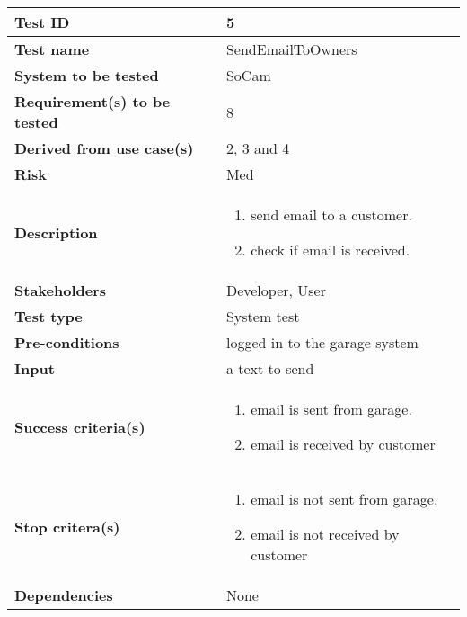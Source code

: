 		\begin{table}[H]
			\begin{tabular}{| p{4cm} | p{10cm} |}
			\hline
			\rowcolor{gray}
				{\bf Test ID} & 5 \\ \hline
				{\bf Test name} & SendEmailToOwners \\ \hline
				{\bf System to be tested} & SoCam \\ \hline
				{\bf Requirement(s) to be tested} & 8 \\ \hline
				{\bf Derived from use case(s)} & 2, 3 and 4\\ \hline
				{\bf Risk} & Med \\ \hline
				{\bf Description} & 
					\begin{enumerate}
						\item send email to a customer.
						\item check if email is received.
					\end{enumerate}
				\\ \hline
				{\bf Stakeholders} & Developer, User \\ \hline
				{\bf Test type} & System test \\ \hline
				{\bf Pre-conditions} & logged in to the garage system \\ \hline
				{\bf Input} & a text to send \\ \hline
				{\bf Success criteria(s)} & 
					\begin{enumerate}
						\item email is sent from garage.
						\item email is received by customer
					\end{enumerate}
				\\ \hline
				{\bf Stop critera(s)} &  
					\begin{enumerate}
						\item email is not sent from garage.
						\item email is not  received by customer
					\end{enumerate} \\ \hline
				{\bf Dependencies} & None\\ \hline
			\end{tabular}
		\end{table}


